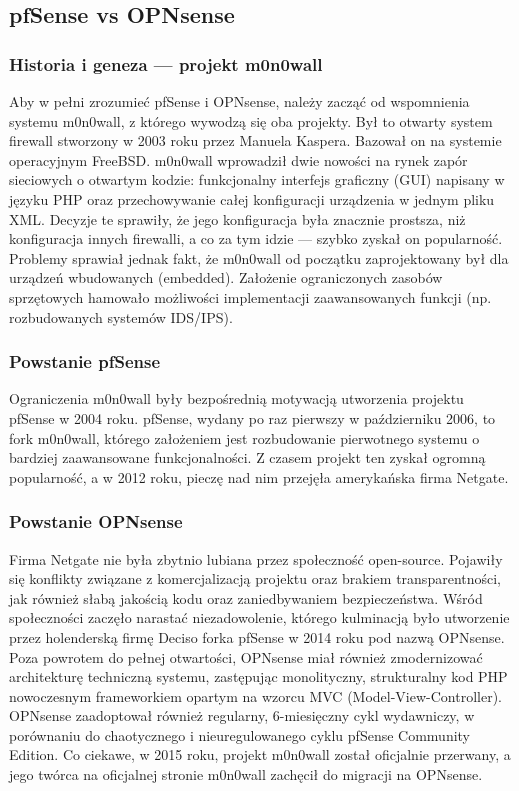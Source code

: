 \documentclass[12pt,a4paper]{article}
\begin{document}
\subsection{pfSense vs OPNsense}


\subsubsection{Historia i geneza --- projekt m0n0wall}
Aby w pełni zrozumieć pfSense i OPNsense, należy zacząć od wspomnienia systemu m0n0wall, z którego wywodzą się oba projekty. Był to otwarty system firewall stworzony w 2003 roku przez Manuela Kaspera. Bazował on na systemie operacyjnym FreeBSD. m0n0wall wprowadził dwie nowości na rynek zapór sieciowych o otwartym kodzie: funkcjonalny interfejs graficzny (GUI) napisany w języku PHP oraz przechowywanie całej konfiguracji urządzenia w jednym pliku XML. Decyzje te sprawiły, że jego konfiguracja była znacznie prostsza, niż konfiguracja innych firewalli, a co za tym idzie --- szybko zyskał on popularność. Problemy sprawiał jednak fakt, że m0n0wall od początku zaprojektowany był dla urządzeń wbudowanych (embedded). Założenie ograniczonych zasobów sprzętowych hamowało możliwości implementacji zaawansowanych funkcji (np. rozbudowanych systemów IDS/IPS).

\subsubsection{Powstanie pfSense}
Ograniczenia m0n0wall były bezpośrednią motywacją utworzenia projektu pfSense w 2004 roku. pfSense, wydany po raz pierwszy w październiku 2006, to fork m0n0wall, którego założeniem jest rozbudowanie pierwotnego systemu o bardziej zaawansowane funkcjonalności. Z czasem projekt ten zyskał ogromną popularność, a w 2012 roku, pieczę nad nim przejęła amerykańska firma Netgate.

\subsubsection{Powstanie OPNsense}
Firma Netgate nie była zbytnio lubiana przez społeczność open-source. Pojawiły się konflikty związane z komercjalizacją projektu oraz brakiem transparentności, jak również słabą jakością kodu oraz zaniedbywaniem bezpieczeństwa. Wśród społeczności zaczęło narastać niezadowolenie, którego kulminacją było utworzenie przez holenderską firmę Deciso forka pfSense w 2014 roku pod nazwą OPNsense. Poza powrotem do pełnej otwartości, OPNsense miał również zmodernizować architekturę techniczną systemu, zastępując monolityczny, strukturalny kod PHP nowoczesnym frameworkiem opartym na wzorcu MVC (Model-View-Controller). OPNsense zaadoptował również regularny, 6-miesięczny cykl wydawniczy, w porównaniu do chaotycznego i nieuregulowanego cyklu pfSense Community Edition. Co ciekawe, w 2015 roku, projekt m0n0wall został oficjalnie przerwany, a jego twórca na oficjalnej stronie m0n0wall zachęcił do migracji na OPNsense.
\end{document}
